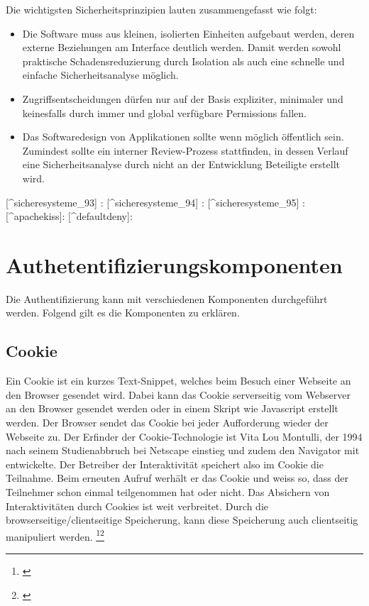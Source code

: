 Die wichtigsten Sicherheitsprinzipien lauten zusammengefasst wie folgt:

\begin{itemize}
\tightlist
\item
  Die Software muss aus kleinen, isolierten Einheiten aufgebaut werden,
  deren externe Beziehungen am Interface deutlich werden. Damit werden
  sowohl praktische Schadensreduzierung durch Isolation als auch eine
  schnelle und einfache Sicherheitsanalyse möglich.
\item
  Zugriffsentscheidungen dürfen nur auf der Basis expliziter, minimaler
  und keinesfalls durch immer und global verfügbare Permissions fallen.
\item
  Das Softwaredesign von Applikationen sollte wenn möglich öffentlich
  sein. Zumindest sollte ein interner Review-Prozess stattfinden, in
  dessen Verlauf eine Sicherheitsanalyse durch nicht an der Entwicklung
  Beteiligte erstellt wird.
\end{itemize}

{[}\^{}sicheresysteme\_93{]} : \autocite[ pp.93]{sicheresysteme}
{[}\^{}sicheresysteme\_94{]} :\autocite[ pp.94]{sicheresysteme}
{[}\^{}sicheresysteme\_95{]} :\autocite[ pp.95]{sicheresysteme}
{[}\^{}apachekiss{]}: \autocite{apachekiss} {[}\^{}defaultdeny{]}:
\autocite{defaultdeny}

\section{Authetentifizierungskomponenten}\label{authetentifizierungskomponenten}

Die Authentifizierung kann mit verschiedenen Komponenten durchgeführt
werden. Folgend gilt es die Komponenten zu erklären.

\subsection{Cookie}\label{cookie}

Ein Cookie ist ein kurzes Text-Snippet, welches beim Besuch einer
Webseite an den Browser gesendet wird. Dabei kann das Cookie
serverseitig vom Webserver an den Browser gesendet werden oder in einem
Skript wie Javascript erstellt werden. Der Browser sendet das Cookie bei
jeder Aufforderung wieder der Webseite zu. Der Erfinder der
Cookie-Technologie ist Vita Lou Montulli, der 1994 nach seinem
Studienabbruch bei Netscape einstieg und zudem den Navigator mit
entwickelte. Der Betreiber der Interaktivität speichert also im Cookie
die Teilnahme. Beim erneuten Aufruf werhält er das Cookie und weiss so,
dass der Teilnehmer schon einmal teilgenommen hat oder nicht. Das
Absichern von Interaktivitäten durch Cookies ist weit verbreitet. Durch
die browserseitige/clientseitige Speicherung, kann diese Speicherung
auch clientseitig manipuliert werden. \footnote{\autocite{cookie-centra}}\footnote{\autocite{google-cookies}}

